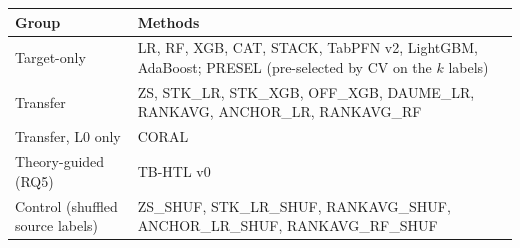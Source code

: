 \begin{tabular}{@{}lp{8.0cm}@{}}
\hline
Group & Methods \\
\hline
Target-only & LR, RF, XGB, CAT, STACK, TabPFN v2, LightGBM, AdaBoost; PRESEL (pre-selected by CV on the $k$ labels) \\
Transfer & ZS, STK\_LR, STK\_XGB, OFF\_XGB, DAUME\_LR, RANKAVG, ANCHOR\_LR, RANKAVG\_RF \\
Transfer, L0 only & CORAL \\
Theory-guided (RQ5) & TB-HTL v0 \\
Control (shuffled source labels) & ZS\_SHUF, STK\_LR\_SHUF, RANKAVG\_SHUF, ANCHOR\_LR\_SHUF, RANKAVG\_RF\_SHUF \\
\hline
\end{tabular}
